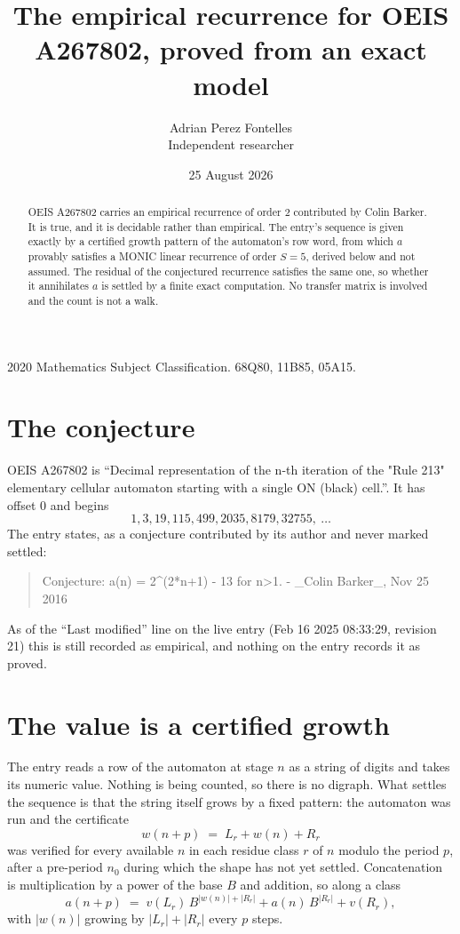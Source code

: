 \documentclass[11pt,a4paper]{article}
\title{The empirical recurrence for OEIS A267802, proved from an exact model}
\author{Adrian Perez Fontelles\\ \small Independent researcher}
\date{25 August 2026}
\theoremstyle{plain}
\theoremstyle{definition}
\begin{document}
\maketitle

\begin{abstract}
OEIS A267802 carries an empirical recurrence of order $2$ contributed by Colin Barker. It is true, and it is
decidable rather than empirical. The entry's sequence is given exactly by a certified growth pattern of the automaton's row word, from
which $a$ provably satisfies a MONIC linear recurrence of order $S=5$, derived below and not
assumed. The residual of the conjectured recurrence satisfies the same one, so whether it
annihilates $a$ is settled by a finite exact computation. No transfer matrix is involved and
the count is not a walk.
\end{abstract}

\noindent\small 2020 Mathematics Subject Classification. 68Q80, 11B85, 05A15.\normalsize

\section{The conjecture}

OEIS A267802 is ``Decimal representation of the n-th iteration of the "Rule 213" elementary cellular automaton starting with a single ON (black) cell.''. It has offset $0$ and begins
\[
1, 3, 19, 115, 499, 2035, 8179, 32755,\ \dots
\]
The entry states, as a conjecture contributed by its author and never marked settled:
\begin{quote}
Conjecture: a(n) = 2\^{}(2*n+1) - 13 for n>1. - \_Colin Barker\_, Nov 25 2016
\end{quote}
As of the ``Last modified'' line on the live entry (Feb 16 2025 08:33:29, revision 21)
this is still recorded as empirical, and nothing on the entry records it as proved.

\section{The value is a certified growth}

The entry reads a row of the automaton at stage $n$ as a string of digits and takes its
numeric value. Nothing is being counted, so there is no digraph. What settles the sequence is
that the string itself grows by a fixed pattern: the automaton was run and the certificate
\[
w(n+p)\;=\;L_r + w(n) + R_r
\]
was verified for every available $n$ in each residue class $r$ of $n$ modulo the period $p$,
after a pre-period $n_0$ during which the shape has not yet settled. Concatenation is
multiplication by a power of the base $B$ and addition, so along a class
\[
a(n+p)\;=\;v(L_r)\,B^{|w(n)|+|R_r|} + a(n)\,B^{|R_r|} + v(R_r),
\]
with $|w(n)|$ growing by $|L_r|+|R_r|$ every $p$ steps.
\end{document}
